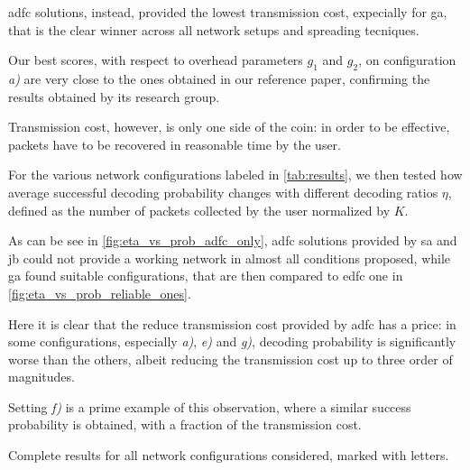 \documentclass[12pt,journal,draftclsnofoot,onecolumn]{IEEEtran}
\makeatletter
\let\origsubsubsection\subsubsection
\renewcommand\subsubsection{\@ifstar{\starsubsubsection}{\nostarsubsubsection}}
\newcommand\nostarsubsubsection[1]
{\subsubsectionprelude\origsubsubsection{#1}}
\newcommand\subsubsectionprelude{%
  \vspace{6pt}
}
\makeatother
\begin{document}
\gls{adfc} solutions, instead, provided the lowest transmission cost, expecially
for \gls{ga}, that is the clear winner across all network setups and spreading tecniques.

\smallbreak
Our best scores, with respect to overhead parameters $g_1$ and $g_2$, on configuration \emph{a)} are very close to the ones obtained in our reference paper\cite{Lin2007}, confirming the results obtained by its research group.

\subsubsection{Successful decoding probability}
Transmission cost, however, is only one side of the coin: in order to be effective, packets have to be recovered in reasonable time by the user.

For the various network configurations labeled in \autoref{tab:results}, we then tested how average successful decoding probability changes with different decoding ratios $\eta$, defined as the number of packets collected by the user normalized by $K$.

As can be see in \autoref{fig:eta_vs_prob_adfc_only}, \gls{adfc} solutions provided by \gls{sa} and \gls{jb} could not provide a working network in almost all conditions proposed, while \gls{ga} found suitable configurations, that are then compared to \gls{edfc} one in \autoref{fig:eta_vs_prob_reliable_ones}.

Here it is clear that the reduce transmission cost provided by \gls{adfc} has a price: in some configurations, especially \emph{a)}, \emph{e)} and \emph{g)},  decoding probability is significantly worse than the others, albeit reducing the transmission cost up to three order of magnitudes.

Setting \emph{f)} is a prime example of this observation, where a similar success probability is obtained, with a fraction of the transmission cost.

\clearpage
\begin{table}[htp]
	\centering
	
	\caption{Complete results for all network configurations considered, marked with letters.}
	\label{tab:results}
\end{table}
\end{document}
